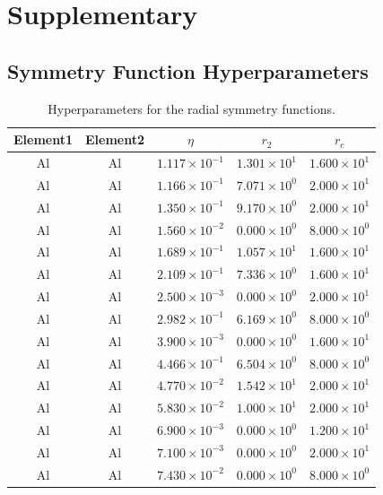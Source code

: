 \documentclass{article}
\renewcommand{\arraystretch}{1.5}
\begin{document}
\newpage
\appendix
\section{Supplementary}
\subsection{Symmetry Function Hyperparameters} \label{apd_sct:symmfunc_hyperparam}

\bgroup
\def\arraystretch{1.2}
\begin{longtable}{ccccc}
\caption{Hyperparameters for the radial symmetry functions.} \\
\hline
Element1 & Element2 & $\eta$ & $r_2$ & $r_c$ \\
\hline
\hline
Al &  Al & $1.117 \times 10^{-1}$ & $1.301 \times 10^{1}$ & $1.600 \times 10^{1}$ \\
Al &  Al & $1.166 \times 10^{-1}$ & $7.071 \times 10^{0}$ & $2.000 \times 10^{1}$ \\
Al &  Al & $1.350 \times 10^{-1}$ & $9.170 \times 10^{0}$ & $2.000 \times 10^{1}$ \\
Al &  Al & $1.560 \times 10^{-2}$ & $0.000 \times 10^{0}$ & $8.000 \times 10^{0}$ \\
Al &  Al & $1.689 \times 10^{-1}$ & $1.057 \times 10^{1}$ & $1.600 \times 10^{1}$ \\
Al &  Al & $2.109 \times 10^{-1}$ & $7.336 \times 10^{0}$ & $1.600 \times 10^{1}$ \\
Al &  Al & $2.500 \times 10^{-3}$ & $0.000 \times 10^{0}$ & $2.000 \times 10^{1}$ \\
Al &  Al & $2.982 \times 10^{-1}$ & $6.169 \times 10^{0}$ & $8.000 \times 10^{0}$ \\
Al &  Al & $3.900 \times 10^{-3}$ & $0.000 \times 10^{0}$ & $1.600 \times 10^{1}$ \\
Al &  Al & $4.466 \times 10^{-1}$ & $6.504 \times 10^{0}$ & $8.000 \times 10^{0}$ \\
Al &  Al & $4.770 \times 10^{-2}$ & $1.542 \times 10^{1}$ & $2.000 \times 10^{1}$ \\
Al &  Al & $5.830 \times 10^{-2}$ & $1.000 \times 10^{1}$ & $2.000 \times 10^{1}$ \\
Al &  Al & $6.900 \times 10^{-3}$ & $0.000 \times 10^{0}$ & $1.200 \times 10^{1}$ \\
Al &  Al & $7.100 \times 10^{-3}$ & $0.000 \times 10^{0}$ & $2.000 \times 10^{1}$ \\
Al &  Al & $7.430 \times 10^{-2}$ & $0.000 \times 10^{0}$ & $8.000 \times 10^{0}$ \\

\end{longtable}
\end{document}
